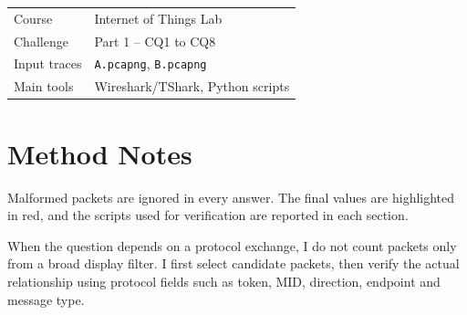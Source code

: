 \documentclass[a4paper,11pt]{article}
\title{\challengename}
\author{
  \authorname\\
  Person Code: \personcode\\
}
\date{\today}
\newcommand{\coursename}{Internet of Things Lab}
\newcommand{\code}[1]{\texttt{#1}}
\begin{document}
\maketitle
\thispagestyle{empty}

\begin{center}
\begin{tabular}{ll}
\toprule
Course & \coursename \\
Challenge & Part 1 -- CQ1 to CQ8 \\
Input traces & \code{A.pcapng}, \code{B.pcapng} \\
Main tools & Wireshark/TShark, Python scripts \\
\bottomrule
\end{tabular}
\end{center}

\vspace{1em}

\newpage
\tableofcontents
\newpage

\section{Method Notes}
Malformed packets are ignored in every answer. The final values are highlighted in
red, and the scripts used for verification are reported in each section.

When the question depends on a protocol exchange, I do not count packets only from a
broad display filter. I first select candidate packets, then verify the actual
relationship using protocol fields such as token, MID, direction, endpoint and
message type.
\end{document}
